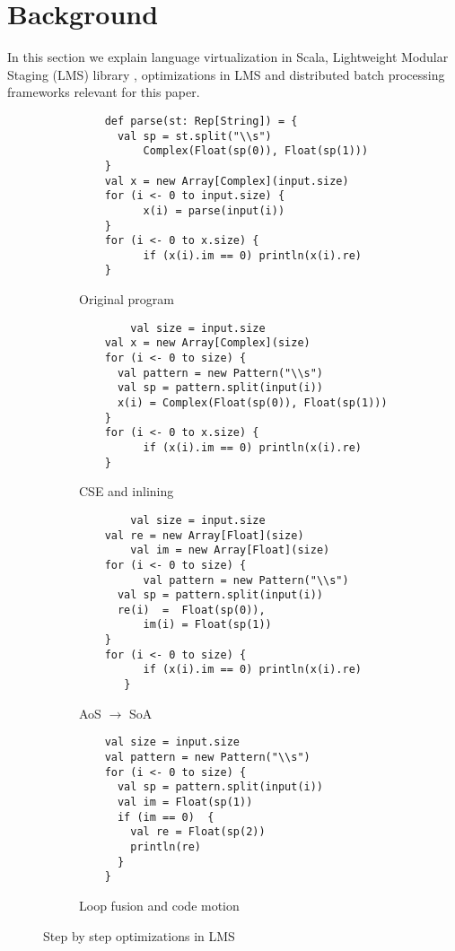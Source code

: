 \section{Background}
\label{sec:background}
In this section we explain language virtualization in Scala, Lightweight Modular
Staging (LMS) library \cite{rompf_lightweight_2010, rompf_lightweight_2012},
optimizations in LMS and distributed batch processing frameworks
relevant for this paper.
\begin{figure*}
  \begin{subfigure}[b]{.5\linewidth}
    \begin{lstlisting}
  	def parse(st: Rep[String]) = {               
	  val sp = st.split("\\s")
          Complex(Float(sp(0)), Float(sp(1)))
	}
	val x = new Array[Complex](input.size)
	for (i <- 0 to input.size) {
     	  x(i) = parse(input(i)) 
	}
	for (i <- 0 to x.size) {
    	  if (x(i).im == 0) println(x(i).re) 
	}
    \end{lstlisting}
    \caption{Original program}
    \label{lst:original}
  \end{subfigure}
  \begin{subfigure}[b]{.5\linewidth}
    \begin{lstlisting}
        val size = input.size
	val x = new Array[Complex](size)
	for (i <- 0 to size) {
   	  val pattern = new Pattern("\\s") 
	  val sp = pattern.split(input(i))
	  x(i) = Complex(Float(sp(0)), Float(sp(1))) 
	}
	for (i <- 0 to x.size) {
          if (x(i).im == 0) println(x(i).re) 
	}
    \end{lstlisting}
    \caption{CSE and inlining} 
    \label{lst:cse-inline}
  \end{subfigure}
  \begin{subfigure}[b]{.5\linewidth}
    \begin{lstlisting}
        val size = input.size
	val re = new Array[Float](size)
        val im = new Array[Float](size)
	for (i <- 0 to size) {
          val pattern = new Pattern("\\s") 
   	  val sp = pattern.split(input(i))
	  re(i)  =  Float(sp(0)),
          im(i) = Float(sp(1)) 
	}
	for (i <- 0 to size) {
          if (x(i).im == 0) println(x(i).re) 
       }
    \end{lstlisting}
    \caption{AoS $\rightarrow$ SoA}
    \label{lst:aos-soa}
  \end{subfigure}
\begin{subfigure}[b]{.5\linewidth}
    \begin{lstlisting}
	val size = input.size
	val pattern = new Pattern("\\s") 
	for (i <- 0 to size) {
	  val sp = pattern.split(input(i))
 	  val im = Float(sp(1))
	  if (im == 0)  {
	    val re = Float(sp(2))
 	    println(re)
   	  }
	}
    \end{lstlisting}
    \caption{Loop fusion and code motion}
    \label{lst:fusion-motion}
  \end{subfigure}
  \caption{Step by step optimizations in LMS}
  \label{lst:step-by-step-lms}
\end{figure*}

